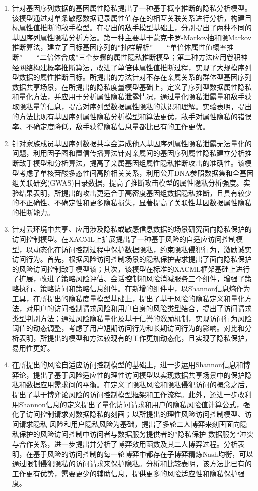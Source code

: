 \begin{enumerate}
	\item 针对基因序列数据的基因属性隐私提出了一种基于概率推断的隐私分析模型。该模型通过对单条敏感数据记录属性值存在的相互关联关系进行分析，构建目标属性值推断的敌手模型。在提出的敌手模型基础上，分别提出了两种不同的基因序列属性隐私分析方法。第一种主要基于蒙克卡罗-Markov抽和隐Markov推断算法，建立了目标基因序列的“抽样解析”——“单倍体属性值概率推断”——“二倍体合成”三个步骤的属性隐私推断模型；第二种方法应用卷积神经网络构建概率推断算法，改进了单倍体属性值推断过程，实现了大规模序列型数据的属性推断目标。所提出的方法针对不存在亲属关系的群体型基因序列数据共享场景，在所提出的隐私度量模型基础上，定义了序列型数据属性隐私和量化方法，并应用于分析属性隐私泄露情况，通过量化隐私泄露量和敌手获取隐私量等信息，提高对序列型数据属性隐私的认识和理解。实验表明，提出的方法比现有基因序列属性隐私分析模型和算法更优，敌手对属性隐私的错误率、不确定度降低，敌手获得隐私信息量都比已有的工作更优。
	\item 针对家族成员基因序列数据共享会造成他人基因序列属性隐私泄露无法量化的问题，利用因子图和置信传播算法针对亲属间的基因序列属性隐私建立分析推断敌手模型和分析算法，提高了亲属基因组属性隐私推断攻击的准确性。该模型考虑了单核苷酸多态性间高阶相关关系，利用公开DNA参照数据集和全基因组关联研究(GWAS)目录数据，提高了推断攻击模型的属性隐私分析强度。实验结果表明，所提出的攻击更适合于高密度基因组数据隐私推断，且具有较少的不正确性、不确定性和更多隐私损失，显著提高了关联性基因数据属性隐私的推断能力。
	\item 针对云环境中共享、应用涉及隐私或敏感信息数据的场景研究面向隐私保护的访问控制模型。在XACML上扩展提出了一种基于风险的自适应访问控制模型，以动态化在访问控制过程中保护数据隐私，约束隐私侵犯行为，激励诚实访问行为。首先，根据风险访问控制场景的隐私保护需求提出了面向隐私保护的风险访问控制敌手模型该；其次，该模型在标准的XACML框架基础上进行了扩展，改进了策略风险评估、会话控制和风险消减服务三个组件，增强了策略执行、策略访问和策略信息组件。在新增的组件中，以Shannon信息熵作为工具，在所提出的隐私度量模型基础上，提出了基于风险的隐私定义和量化方法，对用户的访问控制请求风险和用户自身的风险类型结合，提出了访问请求类型判别方法；通过风险隐私量化及基于信誉的激励机制，实现访问行为风险阈值的动态调整，考虑了用户短期访问行为和长期访问行为的影响。对比和分析表明，所提出的模型和方法较现有的工作更加动态化，且实现了隐私保护，易用性更好。
	
	\item 在所提出的风险自适应访问控制模型的基础上，进一步运用Shannon信息和博弈论，提出了基于风险适应性的理性访问模型以实现数据共享场景中的保护隐私和数据应用需求间的平衡。在定义了隐私风险和隐私侵犯访问的概念之后，提出了基于博弈论风险的访问控制模型框架和工作流程。此外，还进一步改利用Shannon信息的定义提出了量化访问请求和用户的隐私风险值计算公式，强化了访问控制请求对数据隐私的刻画；以所提出的理性风险访问控制模型、访问请求隐私 风险和用户隐私风险为基础，提出了多轮二人博弈来刻画面向隐私保护的风险访问控制中访问者与数据服务提供者的”隐私保护-数据服务“冲突与合作关系，进一步提出并分析了博弈效用函数及其二人博弈过程。分析表明，在基于风险的访问控制的每一轮博弈中都存在子博弈精炼Nash均衡，可以通过限制侵犯隐私的访问请求来保护隐私。分析和比较表明，该方法比已有的工作更有优势，需要更少的辅助信息，提供更多的风险适应性和隐私保护强度。
	

\end{enumerate}
